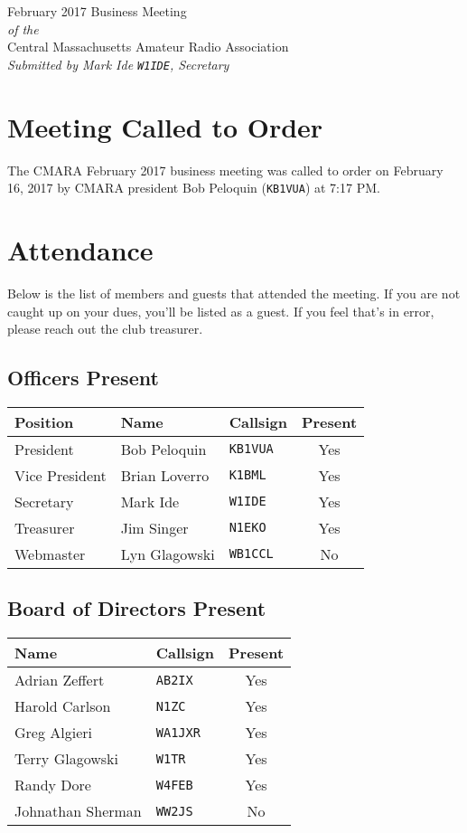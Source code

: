 \documentclass[10pt,letterpaper]{article}
\begin{document}
\begin{center}
{\huge February 2017 Business Meeting}\\
\emph{of the}\\
{\Large Central Massachusetts Amateur Radio Association}\\
\emph{Submitted by Mark Ide \texttt{W1IDE}, Secretary}
\end{center}

\section{Meeting Called to Order}
The CMARA February 2017 business meeting was called to order on February 16, 2017 by CMARA president Bob Peloquin (\texttt{KB1VUA}) at 7:17 PM.

\section{Attendance}
\noindent
Below is the list of members and guests that attended the meeting. If you are not caught up on your dues, you'll be listed as a guest. If you feel that's in error, please reach out the club treasurer.

\subsection{Officers Present}
\begin{tabular}{|l|l|l|c|}
  \hline
  \textbf{Position} & \textbf{Name}  & \textbf{Callsign} & \textbf{Present} \\ \hline
  President         & Bob Peloquin   & \texttt{KB1VUA}   & Yes \\
  Vice President    & Brian Loverro  & \texttt{K1BML}    & Yes \\
  Secretary         & Mark Ide       & \texttt{W1IDE}    & Yes \\
  Treasurer         & Jim Singer     & \texttt{N1EKO}    & Yes \\
  Webmaster         & Lyn Glagowski  & \texttt{WB1CCL}   & No  \\
  \hline
\end{tabular}

\subsection{Board of Directors Present}
\begin{tabular}{|l|l|c|}
  \hline
  \textbf{Name}     & \textbf{Callsign} & \textbf{Present} \\ \hline
  Adrian Zeffert    & \texttt{AB2IX}    & Yes \\
  Harold Carlson    & \texttt{N1ZC}     & Yes \\
  Greg Algieri      & \texttt{WA1JXR}   & Yes \\
  Terry Glagowski   & \texttt{W1TR}     & Yes \\
  Randy Dore        & \texttt{W4FEB}    & Yes \\
  Johnathan Sherman & \texttt{WW2JS}    & No  \\
  \hline
\end{tabular}
\end{document}
